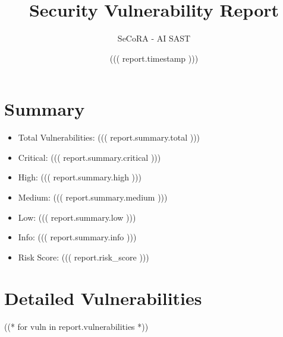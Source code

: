 \documentclass{article}
\title{Security Vulnerability Report}
\author{SeCoRA - AI SAST}
\date{((( report.timestamp )))}
\begin{document}
\maketitle

\section{Summary}
\begin{itemize}
    \item Total Vulnerabilities: ((( report.summary.total )))
    \item Critical: ((( report.summary.critical )))
    \item High: ((( report.summary.high )))
    \item Medium: ((( report.summary.medium )))
    \item Low: ((( report.summary.low )))
    \item Info: ((( report.summary.info )))
    \item Risk Score: ((( report.risk_score )))
\end{itemize}

\section{Detailed Vulnerabilities}
((* for vuln in report.vulnerabilities *))
\end{document}
